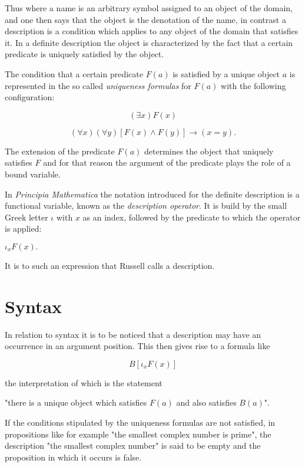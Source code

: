 \documentclass[12pt]{article}
\begin{document}
Thus where a name is an arbitrary symbol assigned to an object of the domain, and one then says that the object is the denotation of the name, in contrast a description is a condition which applies to any object of the domain that satisfies it. In a definite description the object is characterized by the fact that a certain predicate is uniquely satisfied by the object.

The condition that a certain predicate $F (a)$ is satisfied by a unique object $a$ is represented in the so called \emph{uniqueness formulas} for $F (a)$ with the following configuration:

$$(\exists x) F (x)$$
 
$$(\forall x) (\forall y) {[F (x) \wedge F (y)] \to (x = y)}.$$

The extension of the predicate $F (a)$ determines the object that uniquely satisfies $F$ and for that reason the argument of the predicate plays the role of a bound variable.

In \emph{Principia Mathematica} the notation introduced for the definite description is a functional variable, known as the \emph{description operator}. It is build by the small Greek letter $\iota$ with $x$ as an index, followed by the predicate to which the operator is applied: 

\begin{center}
$\iota_{x} F (x).$
\end{center}

It is to such an expression that Russell calls a description.

\section{Syntax}\normalsize

In relation to syntax it is to be noticed that a description may have an occurrence in an argument position. This then gives rise to a formula like

$$B [\iota_{x} F (x)]$$

the interpretation of which is the statement

\begin{center}
"there is a unique object which satisfies $F (a)$ and also satisfies $B (a)$".
\end{center}
 
If the conditions stipulated by the uniqueness formulas are not satisfied, in propositions like for example "the smallest complex number is prime", the description "the smallest complex number" is said to be empty and the proposition in which it occurs is false.
\end{document}

